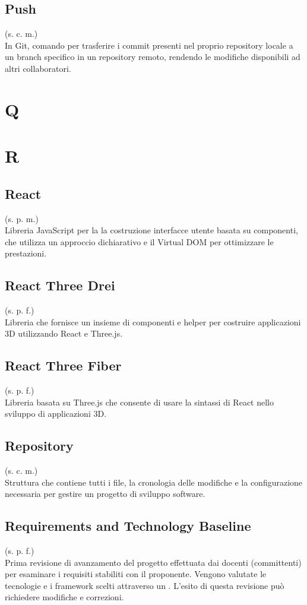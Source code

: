     \subsection{Push}
    (s. c. m.)\\
    In Git, comando per trasferire i commit presenti nel proprio repository locale a un 
    branch specifico in un repository remoto, rendendo le modifiche disponibili 
    ad altri collaboratori.

\pagebreak
\section{Q}
\pagebreak
\section{R}
    \subsection{React}
    (s. p. m.)\\
    Libreria JavaScript per la la costruzione interfacce utente basata su componenti, che utilizza un 
    approccio dichiarativo e il Virtual DOM per ottimizzare le prestazioni.
    \subsection{React Three Drei}
    \label{React Three Drei}
    (s. p. f.)\\
    Libreria che fornisce un insieme di componenti e helper per 
    costruire applicazioni 3D utilizzando React e Three.js.
    \subsection{React Three Fiber}
    \label{React Three Fiber}
    (s. p. f.)\\
    Libreria basata su Three.js che consente di usare la sintassi
    di React nello sviluppo di applicazioni 3D.
    \subsection{Repository}
    \label{Repository}
    (s. c. m.)\\
    Struttura che contiene tutti i file, la cronologia delle modifiche e la 
    configurazione necessaria per gestire un progetto di sviluppo software.
    \subsection{Requirements and Technology Baseline}
    \label{Requirements and Technology Baseline}
    (s. p. f.)\\
    Prima revisione di avanzamento del progetto effettuata dai docenti (committenti) 
    per esaminare i requisiti stabiliti con il proponente. Vengono valutate le 
    tecnologie e i framework scelti attraverso un . 
    L'esito di questa revisione può richiedere modifiche e correzioni.
